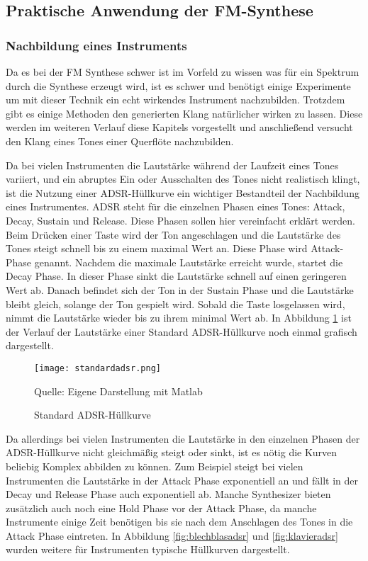 \subsection{Praktische Anwendung der FM-Synthese}
\FloatBarrier
\subsubsection{Nachbildung eines Instruments}
Da es bei der FM Synthese schwer ist im Vorfeld zu wissen was für ein Spektrum durch die Synthese erzeugt wird, ist es schwer und benötigt einige Experimente um mit dieser Technik ein echt wirkendes Instrument nachzubilden.
Trotzdem gibt es einige Methoden den generierten Klang natürlicher wirken zu lassen. Diese werden im weiteren Verlauf diese Kapitels vorgestellt und anschließend versucht den Klang eines Tones einer Querflöte nachzubilden.

Da bei vielen Instrumenten die Lautstärke während der Laufzeit eines Tones variiert, und ein abruptes Ein oder Ausschalten des Tones nicht realistisch klingt, ist die Nutzung einer ADSR-Hüllkurve ein wichtiger Bestandteil der Nachbildung eines Instrumentes. ADSR steht für die einzelnen Phasen eines Tones: Attack, Decay, Sustain und Release. Diese Phasen sollen hier vereinfacht erklärt werden. Beim Drücken einer Taste wird der Ton angeschlagen und die Lautstärke des Tones steigt schnell bis zu einem maximal Wert an. Diese Phase wird Attack-Phase genannt. Nachdem die maximale Lautstärke erreicht wurde, startet die Decay Phase. In dieser Phase sinkt die Lautstärke schnell auf einen geringeren Wert ab. Danach befindet sich der Ton in der Sustain Phase und die Lautstärke bleibt gleich, solange der Ton gespielt wird. Sobald die Taste losgelassen wird, nimmt die Lautstärke wieder bis zu ihrem minimal Wert ab. In Abbildung \ref{fig:defaultADSR} ist der Verlauf der Lautstärke einer Standard ADSR-Hüllkurve noch einmal grafisch dargestellt.

\begin{figure} [ht]
\centering
  \texttt{[image: standardadsr.png]}
\caption{Standard ADSR-Hüllkurve}
\label{fig:defaultADSR}
Quelle: Eigene Darstellung mit Matlab
\end{figure}

Da allerdings bei vielen Instrumenten die Lautstärke in den einzelnen Phasen der ADSR-Hüllkurve nicht gleichmäßig steigt oder sinkt, ist es nötig die Kurven beliebig Komplex abbilden zu können. Zum Beispiel steigt bei vielen Instrumenten die Lautstärke in der Attack Phase exponentiell an und fällt in der Decay und Release Phase auch exponentiell ab. Manche Synthesizer bieten zusätzlich auch noch eine Hold Phase vor der Attack Phase, da manche Instrumente einige Zeit benötigen bis sie nach dem Anschlagen des Tones in die Attack Phase eintreten. In Abbildung \ref{fig:blechblasadsr} und \ref{fig:klavieradsr} wurden weitere für Instrumenten typische Hüllkurven dargestellt.

